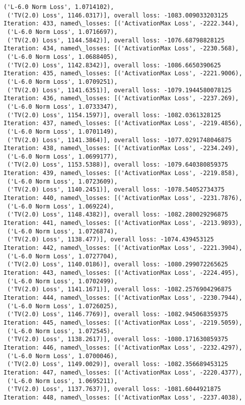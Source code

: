 \documentclass[10pt]{article}
\begin{document}
\begin{Verbatim}[commandchars=\\\{\}]
 ('L-6.0 Norm Loss', 1.0714102),
 ('TV(2.0) Loss', 1146.0317)], overall loss: -1083.009033203125
Iteration: 433, named\_losses: [('ActivationMax Loss', -2222.344),
 ('L-6.0 Norm Loss', 1.0716697),
 ('TV(2.0) Loss', 1144.5842)], overall loss: -1076.68798828125
Iteration: 434, named\_losses: [('ActivationMax Loss', -2230.568),
 ('L-6.0 Norm Loss', 1.0688405),
 ('TV(2.0) Loss', 1142.8342)], overall loss: -1086.6650390625
Iteration: 435, named\_losses: [('ActivationMax Loss', -2221.9006),
 ('L-6.0 Norm Loss', 1.0709251),
 ('TV(2.0) Loss', 1141.6351)], overall loss: -1079.1944580078125
Iteration: 436, named\_losses: [('ActivationMax Loss', -2237.269),
 ('L-6.0 Norm Loss', 1.0733347),
 ('TV(2.0) Loss', 1154.1597)], overall loss: -1082.0361328125
Iteration: 437, named\_losses: [('ActivationMax Loss', -2219.4856),
 ('L-6.0 Norm Loss', 1.0701149),
 ('TV(2.0) Loss', 1141.3864)], overall loss: -1077.0291748046875
Iteration: 438, named\_losses: [('ActivationMax Loss', -2234.249),
 ('L-6.0 Norm Loss', 1.0699177),
 ('TV(2.0) Loss', 1153.5388)], overall loss: -1079.640380859375
Iteration: 439, named\_losses: [('ActivationMax Loss', -2219.858),
 ('L-6.0 Norm Loss', 1.0723609),
 ('TV(2.0) Loss', 1140.2451)], overall loss: -1078.54052734375
Iteration: 440, named\_losses: [('ActivationMax Loss', -2231.7876),
 ('L-6.0 Norm Loss', 1.069224),
 ('TV(2.0) Loss', 1148.4382)], overall loss: -1082.280029296875
Iteration: 441, named\_losses: [('ActivationMax Loss', -2213.9893),
 ('L-6.0 Norm Loss', 1.0726874),
 ('TV(2.0) Loss', 1138.477)], overall loss: -1074.439453125
Iteration: 442, named\_losses: [('ActivationMax Loss', -2221.3904),
 ('L-6.0 Norm Loss', 1.0727704),
 ('TV(2.0) Loss', 1140.0186)], overall loss: -1080.299072265625
Iteration: 443, named\_losses: [('ActivationMax Loss', -2224.495),
 ('L-6.0 Norm Loss', 1.0702499),
 ('TV(2.0) Loss', 1141.1671)], overall loss: -1082.2576904296875
Iteration: 444, named\_losses: [('ActivationMax Loss', -2230.7944),
 ('L-6.0 Norm Loss', 1.0726025),
 ('TV(2.0) Loss', 1146.7769)], overall loss: -1082.945068359375
Iteration: 445, named\_losses: [('ActivationMax Loss', -2219.5059),
 ('L-6.0 Norm Loss', 1.072545),
 ('TV(2.0) Loss', 1138.2617)], overall loss: -1080.171630859375
Iteration: 446, named\_losses: [('ActivationMax Loss', -2232.4297),
 ('L-6.0 Norm Loss', 1.0700046),
 ('TV(2.0) Loss', 1149.0029)], overall loss: -1082.356689453125
Iteration: 447, named\_losses: [('ActivationMax Loss', -2220.4377),
 ('L-6.0 Norm Loss', 1.0695211),
 ('TV(2.0) Loss', 1137.7637)], overall loss: -1081.6044921875
Iteration: 448, named\_losses: [('ActivationMax Loss', -2237.4038),

\end{Verbatim}
\end{document}
